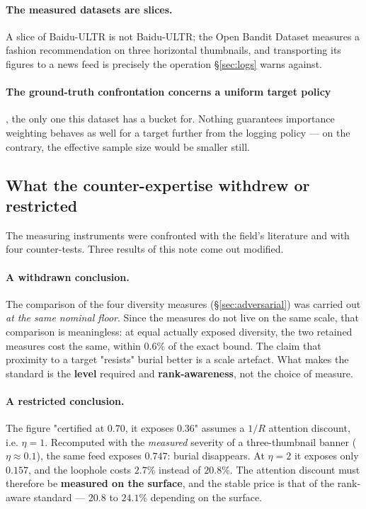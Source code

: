 \documentclass[11pt,a4paper]{article}
\begin{document}
\paragraph{The measured datasets are slices.} A slice of Baidu-ULTR is not Baidu-ULTR; the Open
Bandit Dataset measures a fashion recommendation on three horizontal thumbnails, and
transporting its figures to a news feed is precisely the operation \S\ref{sec:logs} warns
against.

\paragraph{The ground-truth confrontation concerns a uniform target policy}, the only one this
dataset has a bucket for. Nothing guarantees importance weighting behaves as well for a target
further from the logging policy --- on the contrary, the effective sample size would be smaller
still.


\subsection{What the counter-expertise withdrew or restricted}
\label{sec:counterexpertise}

The measuring instruments were confronted with the field's literature and with four
counter-tests. Three results of this note come out modified.

\paragraph{A withdrawn conclusion.} The comparison of the four diversity measures
(\S\ref{sec:adversarial}) was carried out \emph{at the same nominal floor}. Since the measures do
not live on the same scale, that comparison is meaningless: at equal actually exposed diversity,
the two retained measures cost the same, within $0.6\%$ of the exact bound. The claim that
proximity to a target "resists" burial better is a scale artefact. What makes the standard is the
\textbf{level} required and \textbf{rank-awareness}, not the choice of measure.

\paragraph{A restricted conclusion.} The figure "certified at $0.70$, it exposes $0.36$" assumes a
$1/R$ attention discount, i.e. $\eta = 1$. Recomputed with the \emph{measured} severity of a
three-thumbnail banner ($\eta \approx 0.1$), the same feed exposes $0.747$: burial disappears. At
$\eta = 2$ it exposes only $0.157$, and the loophole costs $2.7\%$ instead of $20.8\%$. The
attention discount must therefore be \textbf{measured on the surface}, and the stable price is
that of the rank-aware standard --- $20.8$ to $24.1\%$ depending on the surface.
\end{document}
